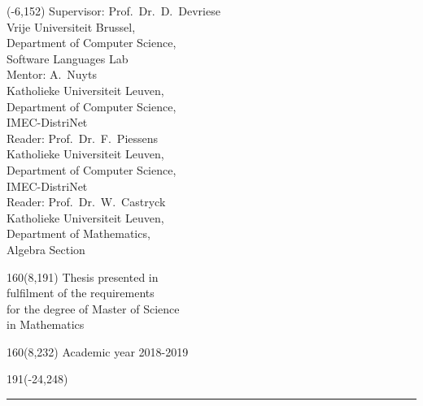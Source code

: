 \documentclass[12pt,a4paper,twoside,xetex]{book} %
\begin{document}
\begin{textblock}{70}(-6,152)
\textblockcolour{}
\vspace{-\parskip}
\flushleft
Supervisor: Prof.~Dr.~D.~Devriese\\[-2pt]
\textcolor{blueaff}{Vrije Universiteit Brussel, \\ 
    Department of Computer Science, \\
    Software Languages Lab}\\[5pt]

Mentor: A.~Nuyts\\[-2pt]
\textcolor{blueaff}{Katholieke Universiteit Leuven, \\
    Department of Computer Science, \\
    IMEC-DistriNet}\\[5pt]

Reader: Prof.~Dr.~F.~Piessens\\[-2pt]
\textcolor{blueaff}{Katholieke Universiteit Leuven, \\
    Department of Computer Science, \\
    IMEC-DistriNet}\\[5pt]
    
Reader: Prof.~Dr.~W.~Castryck \\[-2pt]
\textcolor{blueaff}{Katholieke Universiteit Leuven, \\
    Department of Mathematics, \\
    Algebra Section}\\
\end{textblock}
%
\begin{textblock}{160}(8,191)
\textblockcolour{}
\vspace{-\parskip}
\flushright
Thesis presented in\\[4.5pt]
fulfilment of the requirements\\[4.5pt]
for the degree of Master of Science\\[4.5pt]
in Mathematics\\
\end{textblock}
%
\begin{textblock}{160}(8,232)
\textblockcolour{}
\vspace{-\parskip}
\flushright
Academic year 2018-2019
\end{textblock}
%
\begin{textblock}{191}(-24,248)
{\color{blueline}\rule{550pt}{5.5pt}}
\end{textblock}
%
\vfill
\newpage
\end{document}
